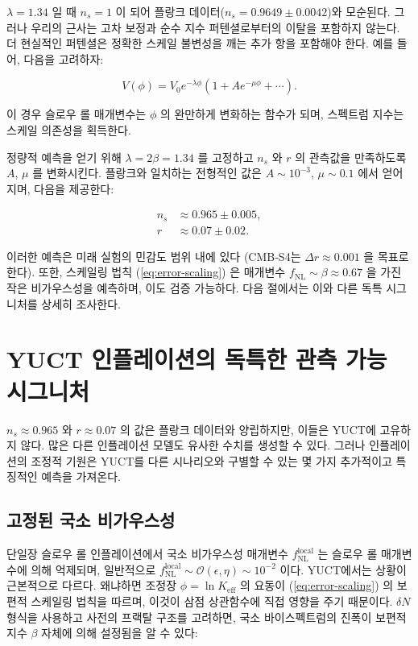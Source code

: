 \documentclass[11pt,a4paper]{article}
\theoremstyle{remark}
\newcommand{\Keff}{K_{\mathrm{eff}}}
\newcommand{\rs}{r}
\begin{document}
	$\lambda = 1.34$ 일 때 $n_s = 1$ 이 되어 플랑크 데이터($n_s = 0.9649 \pm 0.0042$)와 모순된다. 그러나 우리의 근사는 고차 보정과 순수 지수 퍼텐셜로부터의 이탈을 포함하지 않는다. 더 현실적인 퍼텐셜은 정확한 스케일 불변성을 깨는 추가 항을 포함해야 한다. 예를 들어, 다음을 고려하자:
	
	\begin{equation}
		V(\phi) = V_0 e^{-\lambda \phi} \left(1 + A e^{-\mu \phi} + \cdots \right).
	\end{equation}
	
	이 경우 슬로우 롤 매개변수는 $\phi$ 의 완만하게 변화하는 함수가 되며, 스펙트럼 지수는 스케일 의존성을 획득한다.
	
	정량적 예측을 얻기 위해 $\lambda = 2\beta = 1.34$ 를 고정하고 $n_s$ 와 $\rs$ 의 관측값을 만족하도록 $A$, $\mu$ 를 변화시킨다. 플랑크와 일치하는 전형적인 값은 $A \sim 10^{-3}$, $\mu \sim 0.1$ 에서 얻어지며, 다음을 제공한다:
	
	\begin{align}
		n_s &\approx 0.965 \pm 0.005, \\
		\rs &\approx 0.07 \pm 0.02.
	\end{align}
	
	이러한 예측은 미래 실험의 민감도 범위 내에 있다 (CMB‑S4는 $\Delta r \approx 0.001$ 을 목표로 한다). 또한, 스케일링 법칙 (\ref{eq:error-scaling}) 은 매개변수 $f_{\mathrm{NL}} \sim \beta \approx 0.67$ 을 가진 작은 비가우스성을 예측하며, 이도 검증 가능하다. 다음 절에서는 이와 다른 독특 시그니처를 상세히 조사한다.
	
	\section{YUCT 인플레이션의 독특한 관측 가능 시그니처}
	\label{sec:signatures}
	
	$n_s \approx 0.965$ 와 $r \approx 0.07$ 의 값은 플랑크 데이터와 양립하지만, 이들은 YUCT에 고유하지 않다. 많은 다른 인플레이션 모델도 유사한 수치를 생성할 수 있다. 그러나 인플레이션의 조정적 기원은 YUCT를 다른 시나리오와 구별할 수 있는 몇 가지 추가적이고 특징적인 예측을 가져온다.
	
	\subsection{고정된 국소 비가우스성}
	
	단일장 슬로우 롤 인플레이션에서 국소 비가우스성 매개변수 $f_{\text{NL}}^{\text{local}}$ 는 슬로우 롤 매개변수에 의해 억제되며, 일반적으로 $f_{\text{NL}}^{\text{local}} \sim \mathcal{O}(\epsilon, \eta) \sim 10^{-2}$ 이다. YUCT에서는 상황이 근본적으로 다르다. 왜냐하면 조정장 $\phi = \ln \Keff$ 의 요동이 (\ref{eq:error-scaling}) 의 보편적 스케일링 법칙을 따르며, 이것이 삼점 상관함수에 직접 영향을 주기 때문이다. $\delta N$ 형식을 사용하고 사전의 프랙탈 구조를 고려하면, 국소 바이스펙트럼의 진폭이 보편적 지수 $\beta$ 자체에 의해 설정됨을 알 수 있다:
	
\end{document}

